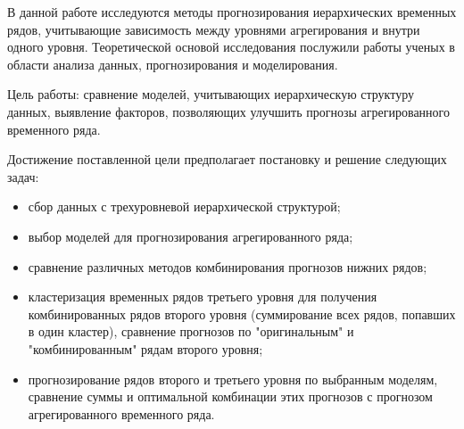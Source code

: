 \documentclass[12pt,a4paper, oneside]{extreport}
\begin{document}
В данной работе исследуются методы прогнозирования иерархических временных рядов, учитывающие зависимость между уровнями агрегирования и внутри одного уровня. Теоретической основой исследования послужили работы ученых в области анализа данных, прогнозирования и моделирования.



Цель работы: сравнение моделей, учитывающих иерархическую структуру данных, выявление факторов, позволяющих улучшить прогнозы агрегированного временного ряда.



Достижение поставленной цели предполагает постановку и решение следующих задач:

\begin{itemize}
	\item сбор данных с трехуровневой иерархической структурой;
	\item выбор моделей для прогнозирования агрегированного ряда;
	\item сравнение различных методов комбинирования прогнозов нижних рядов; 
	\item кластеризация временных рядов третьего уровня для получения комбинированных рядов второго уровня (суммирование всех рядов, попавших в один кластер), сравнение прогнозов по  "оригинальным" и "комбинированным" рядам второго уровня;
	\item прогнозирование рядов второго и третьего уровня по выбранным моделям, сравнение суммы и оптимальной комбинации этих прогнозов с прогнозом агрегированного временного ряда.












\end{itemize}
\end{document}
